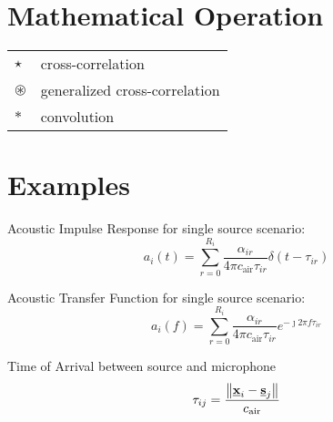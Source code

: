 \section*{Mathematical Operation}
\begin{table}[H]
    \begin{tabular}{ll}
        $\star$   & cross-correlation\\
        $\circledast$ & generalized cross-correlation\\
        $\ast$    & convolution\\
    \end{tabular}
\end{table}

\section*{Examples}

Acoustic Impulse Response for single source scenario:
\begin{equation}
    a_i(t) = \sum_{r=0}^{R_i} \frac{\alpha_{ir}}{4 \pi c_{\text{air}}\tau_{ir}} \delta(t - \tau_{ir})
\end{equation}

Acoustic Transfer Function for single source scenario:
\begin{equation}
    a_i(f) = \sum_{r=0}^{R_i} \frac{\alpha_{ir}}{4 \pi c_{\text{air}}\tau_{ir}} e^{-\jmath 2 \pi f \tau_{ir}}
\end{equation}

Time of Arrival between source and microphone
\begin{equation}
    \tau_{ij} = \frac{\kvvbar{\underline{\mathbf{x}}_i - \underline{\mathbf{s}}_j}}{c_\text{air}}
\end{equation}
